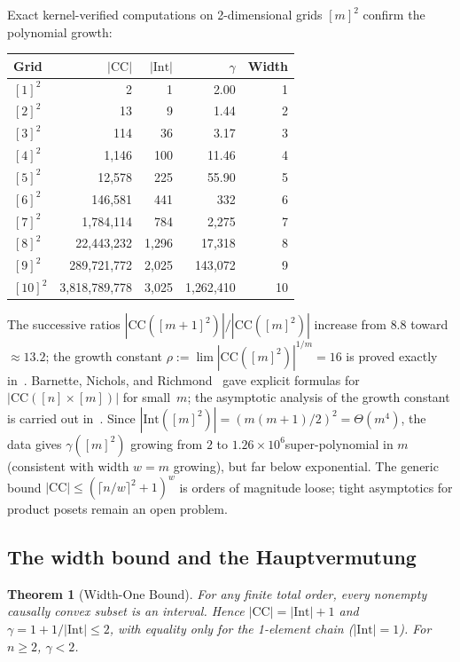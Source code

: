 \documentclass[11pt,a4paper]{article}
\theoremstyle{plain}
\newtheorem{theorem}{Theorem}[section]
\theoremstyle{definition}
\theoremstyle{remark}
\newcommand{\CC}{\mathrm{CC}}
\newcommand{\Int}{\mathrm{Int}}
\begin{document}
Exact kernel-verified computations on 2-dimensional grids $[m]^2$ confirm the polynomial growth:

\medskip
\begin{center}
\begin{tabular}{lrrrr}
\toprule
Grid & $|\CC|$ & $|\Int|$ & $\gamma$ & Width \\
\midrule
$[1]^2$ & 2 & 1 & 2.00 & 1 \\
$[2]^2$ & 13 & 9 & 1.44 & 2 \\
$[3]^2$ & 114 & 36 & 3.17 & 3 \\
$[4]^2$ & 1{,}146 & 100 & 11.46 & 4 \\
$[5]^2$ & 12{,}578 & 225 & 55.90 & 5 \\
$[6]^2$ & 146{,}581 & 441 & 332 & 6 \\
$[7]^2$ & 1{,}784{,}114 & 784 & 2{,}275 & 7 \\
$[8]^2$ & 22{,}443{,}232 & 1{,}296 & 17{,}318 & 8 \\
$[9]^2$ & 289{,}721{,}772 & 2{,}025 & 143{,}072 & 9 \\
$[10]^2$ & 3{,}818{,}789{,}778 & 3{,}025 & 1{,}262{,}410 & 10 \\
\bottomrule
\end{tabular}
\end{center}
\medskip

\noindent The successive ratios $|\CC([m{+}1]^2)| / |\CC([m]^2)|$ increase from $8.8$ toward $\approx 13.2$; the growth constant $\rho := \lim |\CC([m]^2)|^{1/m} = 16$ is proved exactly in~\cite{difiore2026grid}.
Barnette, Nichols, and Richmond~\cite{barnette2019} gave explicit formulas for $|\CC([n] \times [m])|$ for small~$m$; the asymptotic analysis of the growth constant is carried out in~\cite{difiore2026grid}.
Since $|\Int([m]^2)| = (m(m{+}1)/2)^2 = \Theta(m^4)$, the data gives $\gamma([m]^2)$ growing from $2$ to $1.26 \times 10^6$\textemdash super-polynomial in $m$ (consistent with width $w = m$ growing), but far below exponential.
The generic bound $|\CC| \leq (\lceil n/w \rceil^2+1)^w$ is orders of magnitude loose; tight asymptotics for product posets remain an open problem.


\subsection{The width bound and the Hauptvermutung}\label{sec:width}

\begin{theorem}[Width-One Bound]\label{thm:width1}
For any finite total order, every nonempty causally convex subset is an interval.
Hence $|\CC| = |\Int| + 1$ and $\gamma = 1 + 1/|\Int| \leq 2$, with equality only for the 1-element chain ($|\Int| = 1$). For $n \geq 2$, $\gamma < 2$.
\end{theorem}
\end{document}
